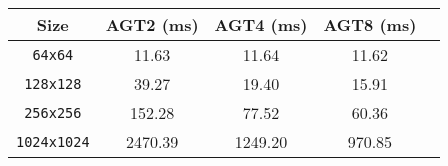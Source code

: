 {\small
\begin{tabular}{|c|c|c|c|c|}
    \hline Size & AGT2 (ms) & AGT4 (ms) & AGT8 (ms) \\
    \hline \verb|64x64| & 11.63 & 11.64 & 11.62 \\
    \verb|128x128| & 39.27 & 19.40 & 15.91 \\
    \verb|256x256| & 152.28 & 77.52 & 60.36 \\
    \verb|1024x1024| & 2470.39 & 1249.20 & 970.85 \\
    \hline
\end{tabular}}